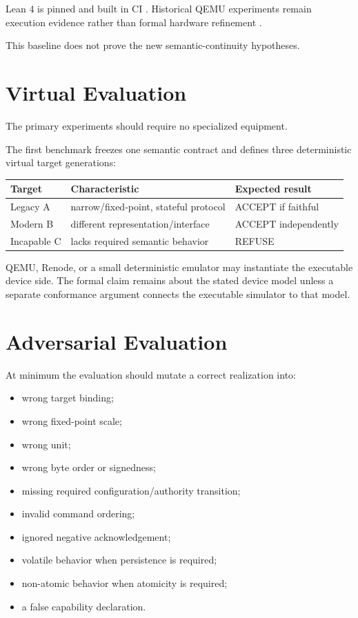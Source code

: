\documentclass[11pt,a4paper]{article}
\begin{document}
Lean 4 is pinned and built in CI \cite{moura2021lean4}. Historical QEMU
experiments remain execution evidence rather than formal hardware refinement
\cite{qemu}.

This baseline does not prove the new semantic-continuity hypotheses.

\section{Virtual Evaluation}

The primary experiments should require no specialized equipment.

The first benchmark freezes one semantic contract and defines three
deterministic virtual target generations:

\begin{center}
\begin{tabular}{lll}
\toprule
Target & Characteristic & Expected result \\
\midrule
Legacy A & narrow/fixed-point, stateful protocol & ACCEPT if faithful \\
Modern B & different representation/interface & ACCEPT independently \\
Incapable C & lacks required semantic behavior & REFUSE \\
\bottomrule
\end{tabular}
\end{center}

QEMU, Renode, or a small deterministic emulator may instantiate the executable
device side. The formal claim remains about the stated device model unless a
separate conformance argument connects the executable simulator to that model.

\section{Adversarial Evaluation}

At minimum the evaluation should mutate a correct realization into:

\begin{itemize}
\item wrong target binding;
\item wrong fixed-point scale;
\item wrong unit;
\item wrong byte order or signedness;
\item missing required configuration/authority transition;
\item invalid command ordering;
\item ignored negative acknowledgement;
\item volatile behavior when persistence is required;
\item non-atomic behavior when atomicity is required;
\item a false capability declaration.
\end{itemize}
\end{document}
